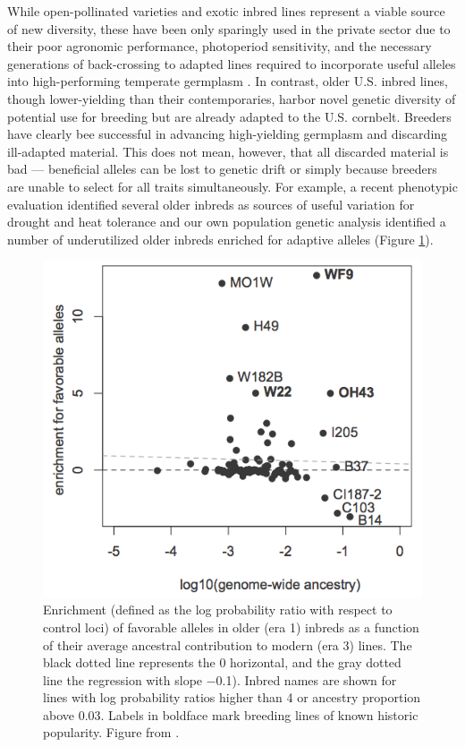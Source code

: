 \documentclass[final,12pt]{article}
\begin{document}
While open-pollinated varieties and exotic inbred lines represent a viable source of new diversity, these have been only sparingly used in the private sector due to their poor agronomic performance, photoperiod sensitivity, and the necessary generations of back-crossing to adapted lines required to incorporate useful alleles into high-performing temperate germplasm \citep{goodman1999broadening}.
In contrast, older U.S. inbred lines, though lower-yielding than their contemporaries, harbor novel genetic diversity of potential use for breeding but are already adapted to the U.S. cornbelt.  
Breeders have clearly bee successful in advancing high-yielding germplasm and discarding ill-adapted material.
This does not mean, however, that all discarded material is bad --- beneficial alleles can be lost to genetic drift or simply because breeders are unable to select for all traits simultaneously. 
For example, a recent phenotypic evaluation identified several older inbreds as sources of useful variation for drought and heat tolerance \citep{chen2012characterization} and our own population genetic analysis identified a number of underutilized older inbreds enriched for adaptive alleles (Figure \ref{fig:wf9}).

\begin{figure}
\includegraphics[width=0.5\linewidth]{joost_wf9.png}
\caption{Enrichment (defined as the log probability ratio with respect to control loci) of favorable alleles in older (era 1) inbreds as a function of their average ancestral contribution to modern (era 3) lines. The black dotted line represents the 0 horizontal, and the gray dotted line the regression  with slope −0.1). Inbred names are shown for lines with log probability ratios higher than 4 or ancestry proportion above 0.03. Labels in boldface mark breeding lines of known historic popularity. Figure from \citet{van2012historical}.} 
\label{fig:wf9}
\end{figure}
\end{document}
